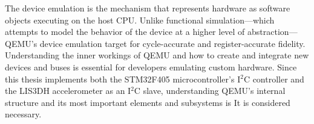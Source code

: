 The device emulation is the mechanism that represents hardware as software 
objects executing on the host CPU. Unlike functional simulation—which attempts to 
model the behavior of the device at a higher level of abstraction—QEMU's device 
emulation target for cycle-accurate and register-accurate fidelity. Understanding 
the inner workings of QEMU and how to create and integrate new devices and 
buses is essential for developers emulating custom hardware. Since this thesis 
implements both the STM32F405 microcontroller's I$^2$C controller and the LIS3DH 
accelerometer as an I$^2$C slave, understanding QEMU's internal structure and its 
most important elements and subsystems is It is considered necessary. 




